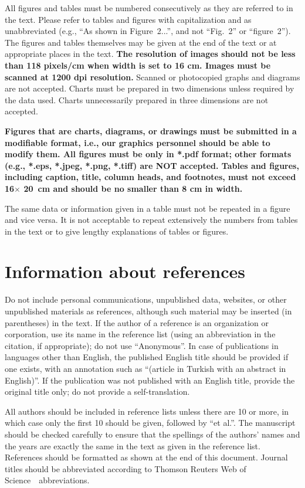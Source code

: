 \documentclass{elektr}
\begin{document}
All figures and tables must be numbered consecutively as they are referred to in the text. Please refer to tables and figures with capitalization and as unabbreviated (e.g., ``As shown in Figure~2...'', and not ``Fig.~2'' or ``figure~2''). The figures and tables themselves may be given at the end of the text or at appropriate places in the text. \textbf{The resolution of images should not be less than 118 pixels/cm when width is set to 16 cm. Images must be scanned at 1200 dpi resolution.} Scanned or photocopied graphs and diagrams are not accepted. Charts must be prepared in two dimensions unless required by the data used. Charts unnecessarily prepared in three dimensions are not accepted.

\textbf{Figures that are charts, diagrams, or drawings must be submitted in a modifiable format, i.e., our graphics personnel should be able to modify them. All figures must be only in *.pdf format; other formats (e.g., *.eps, *.jpeg, *.png, *.tiff) are NOT accepted. Tables and figures, including caption, title, column heads, and footnotes, must not exceed 16$\times$ 20~cm and should be no smaller than 8 cm in width.} 
 
The same data or information given in a table must not be repeated in a figure and vice versa. It is not acceptable to repeat extensively the numbers from tables in the text or to give lengthy explanations of tables or figures.

\section{Information about references}
Do not include personal communications, unpublished data, websites, or other unpublished materials as references, although such material may be inserted (in parentheses) in the text. If the author of a reference is an organization or corporation, use its name in the reference list (using an abbreviation in the citation, if appropriate); do not use ``Anonymous''. In case of publications in languages other than English, the published English title should be provided if one exists, with an annotation such as ``(article in Turkish with an abstract in English)''. If the publication was not published with an English title, provide the original title only; do not provide a self-translation.

All authors should be included in reference lists unless there are 10 or more, in which case only the first 10 should be given, followed by ``et al.''. The manuscript should be checked carefully to ensure that the spellings of the authors' names and the years are exactly the same in the text as given in the reference list. References should be formatted as shown at the end of this document. Journal titles should be abbreviated according to Thomson Reuters Web of Science~\textcopyright~abbreviations.
\end{document}
